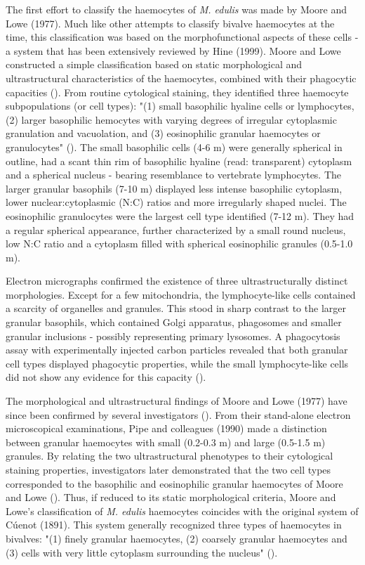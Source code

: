 The first effort to classify the haemocytes of \emph{M. edulis} was made by Moore and Lowe (1977). Much like other attempts to classify bivalve haemocytes at the time, this classification was based on the morphofunctional aspects of these cells - a system that has been extensively reviewed by Hine (1999). Moore and Lowe constructed a simple classification based on static morphological and ultrastructural characteristics of the haemocytes, combined with their phagocytic capacities (\cite{Moore1977}). From routine cytological staining, they identified three haemocyte subpopulations (or cell types): "(1) small basophilic hyaline cells or lymphocytes, (2) larger basophilic hemocytes with varying degrees of irregular cytoplasmic granulation and vacuolation, and (3) eosinophilic granular haemocytes or granulocytes" (\cite{Moore1977}). The small basophilic cells (4-6 \micro m) were generally spherical in outline, had a scant thin rim of basophilic hyaline (read: transparent) cytoplasm and a spherical nucleus - bearing resemblance to vertebrate lymphocytes. The larger granular basophils (7-10 \micro m) displayed less intense basophilic cytoplasm, lower nuclear:cytoplasmic (N:C) ratios and more irregularly shaped nuclei. The eosinophilic granulocytes were the largest cell type identified (7-12 \micro m). They had a regular spherical appearance, further characterized by a small round nucleus, low N:C ratio and a cytoplasm filled with spherical eosinophilic granules (0.5-1.0 \micro m).

Electron micrographs confirmed the existence of three ultrastructurally distinct morphologies. Except for a few mitochondria, the lymphocyte-like cells contained a scarcity of organelles and granules. This stood in sharp contrast to the larger granular basophils, which contained Golgi apparatus, phagosomes and smaller granular inclusions - possibly representing primary lysosomes. A phagocytosis assay with experimentally injected carbon particles revealed that both granular cell types displayed phagocytic properties, while the small lymphocyte-like cells did not show any evidence for this capacity (\cite{Moore1977}).

The morphological and ultrastructural findings of Moore and Lowe (1977) have since been confirmed by several investigators (\cite{Rasmussen1985, Renwartz1990, Pipe1990, Noel1994, Pipe1997, Wootton2003}). From their stand-alone electron microscopical examinations, Pipe and colleagues (1990) made a distinction between granular haemocytes with small (0.2-0.3 \micro m) and large (0.5-1.5 \micro m) granules. By relating the two ultrastructural phenotypes to their cytological staining properties, investigators later demonstrated that the two cell types corresponded to the basophilic and eosinophilic granular haemocytes of Moore and Lowe (\cite{Pipe1990, Noel1994}). Thus, if reduced to its static morphological criteria, Moore and Lowe's classification of \emph{M. edulis} haemocytes coincides with the original system of Cúenot (1891). This system generally recognized three types of haemocytes in bivalves: "(1) finely granular haemocytes, (2) coarsely granular haemocytes and (3) cells with very little cytoplasm surrounding the nucleus" (\cite{Cheng1984}). 

